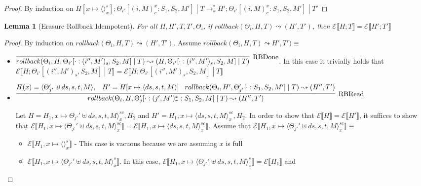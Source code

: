\documentclass[9pt]{article}
\newtheorem{lemma}{Lemma}
\newcommand\specStep{\rightarrow_{s}}
\newcommand{\erase}[1]{\mathcal{E}\llbracket #1 \rrbracket}
\begin{document}
\begin{proof}
By induction on $H[x \mapsto \langle\rangle_x^s]; \Theta_{i'}[(i, M)_c^x : S_1, S_2, M'] \; | \; T \specStep^* H'; \Theta_{i'}[(i, M)_c^x : S_1, S_2, M'] \; | \; T'$
\end{proof}

\begin{lemma}[Erasure Rollback Idempotent]
\label{eraseRollbackIdempotence}
For all $H, H', T, T', \Theta_i$, if $rollback(\Theta_i, H, T) \leadsto (H', T')$, then $\erase{H; T} = \erase{H'; T'}$

\end{lemma}

\begin{proof}
By induction on $rollback(\Theta_i, H, T) \leadsto (H', T')$.  Assume $rollback(\Theta_i, H, T) \leadsto H', T') \equiv$

\begin{itemize}
\item $\infer[\text{RBDone}]{rollback(\Theta_i, H, \Theta_{i'}[\cdot : (i'', M')_s, S_2, M] \; | \; T) \leadsto (H, \Theta_{i'}[\cdot : (i'', M')_s, S_2, M] \; | \; T)}{}$.  In this case it trivially holds that $\erase{H; \Theta_{i'}[(i'', M')_s, S_2, M] \; | \; T} = \erase{H; \Theta_{i'}[(i'', M')_s, S_2, M] \; | \; T}$

\item $\infer[\text{RBRead}]{rollback(\Theta_i, H, \Theta_j'[\cdot : (j', M')_r^x : S_1, S_2, M] \; | \; T) \leadsto (H'', T')}{H(x) = \langle \Theta_{j'}' \uplus ds, s, t, M\rangle, \;\;\; H' = H[x \mapsto \langle ds, s, t, M\rangle] \;\;\; rollback(\Theta_i, H', \Theta_{j'}'[\cdot : S_1, S_2, M'] \; | \; T) \leadsto (H'', T')}$

Let $H = H_1, x\mapsto \Theta_{j'}' \uplus ds, s, t, M\rangle_x^{sc}, H_2$ and $H' = H_1, x \mapsto \langle ds, s, t, M\rangle_x^{sc}, H_2$.  In order to show that $\erase{H} = \erase{H'}$, it suffices to show that $\erase{H_1, x \mapsto \langle \Theta_{j'}' \uplus ds, s, t, M\rangle_x^{sc}} = \erase{H_1, x \mapsto \langle ds, s, t, M\rangle_x^{sc}}$.  Assume that $\erase{H_1, x \mapsto \langle \Theta_{j'}' \uplus ds, s, t, M\rangle_x^{sc}} \equiv $

\begin{itemize}
\item  $\erase{H_1, x \mapsto \langle\rangle_x^s} $ - This case is vacuous because we are assuming $x$ is full
\item  $\erase{H_1, x \mapsto \langle \Theta_{j'}' \uplus ds, s, t, M\rangle_x^s}$.  In this case, $\erase{H_1, x \mapsto \langle \Theta_{j'}' \uplus ds, s, t, M\rangle_x^s} = \erase{H_1}$ and 


\end{itemize}
\end{itemize}
\end{proof}
\end{document}
